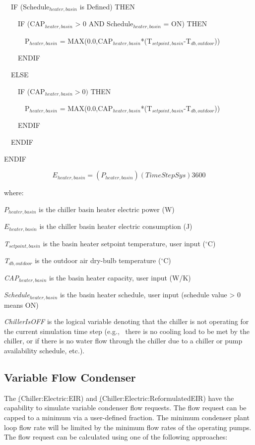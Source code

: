 ~~IF (Schedule\(_{heater,basin}\) is Defined) THEN

~~~~IF (CAP\(_{heater,basin}\) > 0 AND Schedule\(_{heater,basin}\) = ON) THEN

~~~~~~P\(_{heater,basin}\) = MAX(0.0,CAP\(_{heater,basin}\)*(T\(_{setpoint,basin}\)-T\(_{db,outdoor}\)))

~~~~ENDIF

~~ELSE

~~~~IF (CAP\(_{heater,basin} > 0)\) THEN

~~~~~~P\(_{heater,basin}\) = MAX(0.0,CAP\(_{heater,basin}\)*(T\(_{setpoint,basin}\)-T\(_{db,outdoor}\)))

~~~~ENDIF

~~ENDIF

ENDIF

\begin{equation}
{E_{heater,basin}} = \left( {{P_{heater,basin}}} \right)\left( {TimeStepSys} \right)3600
\end{equation}

where:

\({P_{heater,basin}}\) is the chiller basin heater electric power (W)

\({E_{heater,basin}}\) is the chiller basin heater electric consumption (J)

\emph{T\(_{setpoint,basin}\)} is the basin heater setpoint temperature, user input (\(^{\circ}\)C)

\emph{T\(_{db,outdoor}\)} is the outdoor air dry-bulb temperature (\(^{\circ}\)C)

\emph{CAP\(_{heater,basin}\)} is the basin heater capacity, user input (W/K)

\emph{Schedule\(_{heater,basin}\)} is the basin heater schedule, user input (schedule value \textgreater{} 0 means ON)

\emph{ChillerIsOFF} is the logical variable denoting that the chiller is not operating for the current simulation time step (e.g.,~ there is no cooling load to be met by the chiller, or if there is no water flow through the chiller due to a chiller or pump availability schedule, etc.).

\subsection{Variable Flow Condenser}\label{variable-flow-condenser}

The \hyperref[electric-chiller-model-based-on-condenser-entering-temperature](Chiller:Electric:EIR) and \hyperref[electric-chiller-model-based-on-condenser-leaving-temperature](Chiller:Electric:ReformulatedEIR) have the capability to simulate variable condenser flow requests. The flow request can be capped to a minimum via a user-defined fraction. The minimum condenser plant loop flow rate will be limited by the minimum flow rates of the operating pumps. The flow request can be calculated using one of the following approaches:

